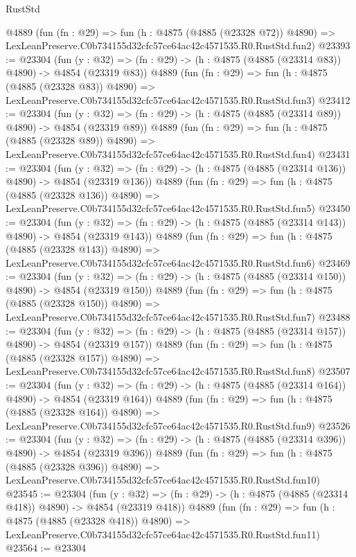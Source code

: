 \begin{lexlean}{RustStd}
\begin{coremodule}
    @4889
    (fun (fn : @29) =>
    fun (h : @4875 (@4885 (@23328 @72)) @4890) =>
    LexLeanPreserve.C0b734155d32cfc57ce64ac42c4571535.R0.RustStd.fun2)
@23393 := @23304
    (fun (y : @32) => (fn : @29) -> (h : @4875 (@4885 (@23314 @83)) @4890) -> @4854 (@23319 @83))
    @4889
    (fun (fn : @29) =>
    fun (h : @4875 (@4885 (@23328 @83)) @4890) =>
    LexLeanPreserve.C0b734155d32cfc57ce64ac42c4571535.R0.RustStd.fun3)
@23412 := @23304
    (fun (y : @32) => (fn : @29) -> (h : @4875 (@4885 (@23314 @89)) @4890) -> @4854 (@23319 @89))
    @4889
    (fun (fn : @29) =>
    fun (h : @4875 (@4885 (@23328 @89)) @4890) =>
    LexLeanPreserve.C0b734155d32cfc57ce64ac42c4571535.R0.RustStd.fun4)
@23431 := @23304
    (fun (y : @32) => (fn : @29) -> (h : @4875 (@4885 (@23314 @136)) @4890) -> @4854 (@23319 @136))
    @4889
    (fun (fn : @29) =>
    fun (h : @4875 (@4885 (@23328 @136)) @4890) =>
    LexLeanPreserve.C0b734155d32cfc57ce64ac42c4571535.R0.RustStd.fun5)
@23450 := @23304
    (fun (y : @32) => (fn : @29) -> (h : @4875 (@4885 (@23314 @143)) @4890) -> @4854 (@23319 @143))
    @4889
    (fun (fn : @29) =>
    fun (h : @4875 (@4885 (@23328 @143)) @4890) =>
    LexLeanPreserve.C0b734155d32cfc57ce64ac42c4571535.R0.RustStd.fun6)
@23469 := @23304
    (fun (y : @32) => (fn : @29) -> (h : @4875 (@4885 (@23314 @150)) @4890) -> @4854 (@23319 @150))
    @4889
    (fun (fn : @29) =>
    fun (h : @4875 (@4885 (@23328 @150)) @4890) =>
    LexLeanPreserve.C0b734155d32cfc57ce64ac42c4571535.R0.RustStd.fun7)
@23488 := @23304
    (fun (y : @32) => (fn : @29) -> (h : @4875 (@4885 (@23314 @157)) @4890) -> @4854 (@23319 @157))
    @4889
    (fun (fn : @29) =>
    fun (h : @4875 (@4885 (@23328 @157)) @4890) =>
    LexLeanPreserve.C0b734155d32cfc57ce64ac42c4571535.R0.RustStd.fun8)
@23507 := @23304
    (fun (y : @32) => (fn : @29) -> (h : @4875 (@4885 (@23314 @164)) @4890) -> @4854 (@23319 @164))
    @4889
    (fun (fn : @29) =>
    fun (h : @4875 (@4885 (@23328 @164)) @4890) =>
    LexLeanPreserve.C0b734155d32cfc57ce64ac42c4571535.R0.RustStd.fun9)
@23526 := @23304
    (fun (y : @32) => (fn : @29) -> (h : @4875 (@4885 (@23314 @396)) @4890) -> @4854 (@23319 @396))
    @4889
    (fun (fn : @29) =>
    fun (h : @4875 (@4885 (@23328 @396)) @4890) =>
    LexLeanPreserve.C0b734155d32cfc57ce64ac42c4571535.R0.RustStd.fun10)
@23545 := @23304
    (fun (y : @32) => (fn : @29) -> (h : @4875 (@4885 (@23314 @418)) @4890) -> @4854 (@23319 @418))
    @4889
    (fun (fn : @29) =>
    fun (h : @4875 (@4885 (@23328 @418)) @4890) =>
    LexLeanPreserve.C0b734155d32cfc57ce64ac42c4571535.R0.RustStd.fun11)
@23564 := @23304

\end{coremodule}
\end{lexlean}

